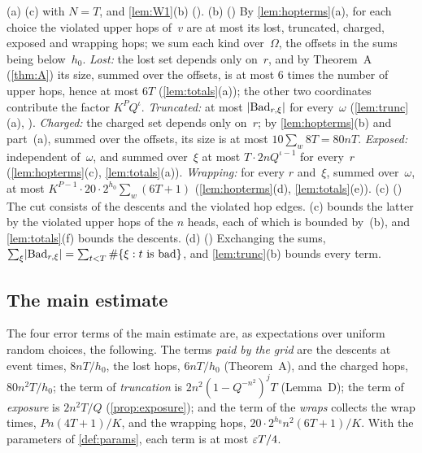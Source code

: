 \begin{outline}
(a) (c) with $N=T$, and \cref{lem:W1}(b) (). (b) ()
By \cref{lem:hopterms}(a), for each choice the violated upper hops of~$v$ are at most its lost, truncated, charged, exposed and
wrapping hops; we sum each kind over~$\Omega$, the offsets in the sums being below~$h_0$. \emph{Lost:} the lost set depends only
on~$r$, and by Theorem~A (\cref{thm:A}) its size, summed over the offsets, is at most $6$ times the number of upper hops, hence at
most $6T$ (\cref{lem:totals}(a)); the other two coordinates contribute the factor $K^PQ^\iota$. \emph{Truncated:} at most
$\lvert \mathrm{Bad}_{r,\xi} \rvert$ for every~$\omega$ (\cref{lem:trunc}(a), ). \emph{Charged:} the charged
set depends only on~$r$; by \cref{lem:hopterms}(b) and part~(a), summed over the offsets, its size is at most $10\sum_w8T=80nT$.
\emph{Exposed:} independent of~$\omega$, and summed over~$\xi$ at most $T\cdot2nQ^{\iota-1}$ for every~$r$ (\cref{lem:hopterms}(c),
\cref{lem:totals}(a)). \emph{Wrapping:} for every $r$ and~$\xi$, summed over~$\omega$, at most
$K^{P-1}\cdot20\cdot2^{h_0}\sum_w(6T+1)$ (\cref{lem:hopterms}(d), \cref{lem:totals}(e)). (c) () The cut
consists of the descents and the violated hop edges. (c) bounds the latter by the violated upper hops of the
$n$ heads, each of which is bounded by~(b), and \cref{lem:totals}(f) bounds the descents. (d) () Exchanging the
sums, $\sum_\xi\lvert \mathrm{Bad}_{r,\xi} \rvert=\sum_{t<T}\#\{\xi:t\text{ is bad}\}$, and \cref{lem:trunc}(b) bounds every term.
\end{outline}

\subsection{The main estimate}\label{sec:proof-main}

The four error terms of the main estimate are, as expectations over uniform random choices, the following. The terms \emph{paid
by the grid} are the descents at event times, $8nT/h_0$, the lost hops, $6nT/h_0$ (Theorem~A), and the charged hops,
$80n^2T/h_0$; the term of \emph{truncation} is $2n^2(1-Q^{-n^2})^jT$ (Lemma~D); the term of \emph{exposure} is $2n^2T/Q$
(\cref{prop:exposure}); and the term of the \emph{wraps} collects the wrap times, $Pn(4T+1)/K$, and the wrapping hops,
$20\cdot2^{h_0}n^2(6T+1)/K$. With the parameters of \cref{def:params}, each term is at most $\varepsilon T/4$.


